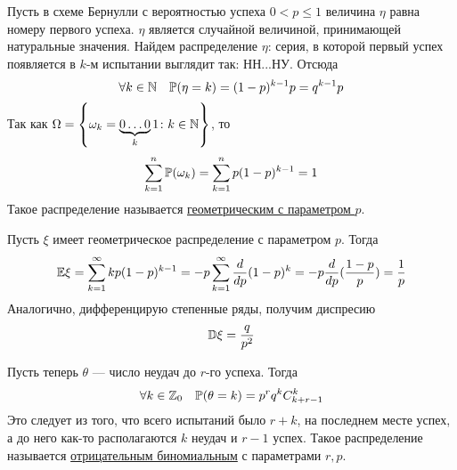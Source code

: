 Пусть в схеме Бернулли с вероятностью успеха $0 < p \le 1$ величина $\eta$ равна номеру первого успеха. $\eta$ является случайной величиной, принимающей натуральные значения. Найдем распределение $\eta$: серия, в которой первый успех появляется в $k$-м испытании выглядит так: НН...НУ. Отсюда
$$\forall k \in \mathbb{N} \quad \mathbb{P}(\eta = k) = (1-p)^{k-1}p = q^{k-1}p $$
Так как $\Omega = \left\{ \omega_k = \underbrace{0\ldots0}_k1 \colon k \in \mathbb{N} \right\}$, то 
$$\sum\limits_{k = 1}^{n}\mathbb{P}(\omega_k) = \sum\limits_{k = 1}^{n} p(1-p)^{k-1} = 1$$
Такое распределение называется \underline{геометрическим с параметром $p$}.

Пусть $\xi$ имеет геометрическое распределение с параметром $p$. Тогда
$$\mathbb{E}\xi = \sum\limits_{k = 1}^{\infty}kp(1-p)^{k-1} = -p\sum\limits_{k = 1}^{\infty}\frac{d}{dp}(1-p)^k = -p \frac{d}{dp}(\frac{1-p}{p}) = \frac1{p}$$
Аналогично, дифференцирую степенные ряды, получим диспресию
$$\mathbb{D}\xi = \frac{q}{p^2}$$

Пусть теперь $\theta$ --- число неудач до $r$-го успеха. Тогда
$$\forall k \in\mathbb{Z}_0 \quad \mathbb{P}(\theta = k) = p^rq^kC_{k+r-1}^{k}$$
Это следует из того, что всего испытаний было $r+k$, на последнем месте успех, а до него как-то располагаются $k$ неудач и $r-1$ успех.
Такое распределение называется \underline{отрицательным биномиальным} с параметрами $r, p$.

\newpage

